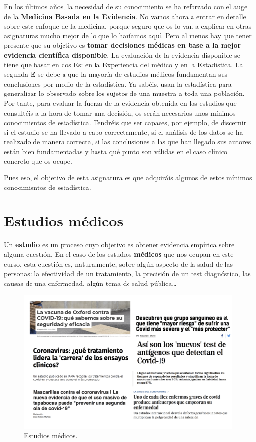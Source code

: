 \documentclass[
]{book}
\theoremstyle{definition}
\theoremstyle{definition}
\theoremstyle{definition}
\theoremstyle{definition}
\theoremstyle{remark}
\begin{document}
En los últimos años, la necesidad de su conocimiento se ha reforzado con el auge de la \textbf{Medicina Basada en la Evidencia}. No vamos ahora a entrar en detalle sobre este enfoque de la medicina, porque seguro que os lo van a explicar en otras asignaturas mucho mejor de lo que lo haríamos aquí. Pero al menos hay que tener presente que su objetivo es \textbf{tomar decisiones médicas en base a la mejor evidencia científica disponible}. La evaluación de la evidencia disponible se tiene que basar en dos Es: en la \textbf{E}xperiencia del médico y en la \textbf{E}stadística. La segunda \textbf{E} se debe a que la mayoría de estudios médicos fundamentan sus conclusiones por medio de la estadística. Ya sabéis, usan la estadística para generalizar lo observado sobre los sujetos de una muestra a toda una población. Por tanto, para evaluar la fuerza de la evidencia obtenida en los estudios que consultéis a la hora de tomar una decisión, os serán necesarios unos mínimos conocimientos de estadística. Tendréis que ser capaces, por ejemplo, de discernir si el estudio se ha llevado a cabo correctamente, si el análisis de los datos se ha realizado de manera correcta, si las conclusiones a las que han llegado sus autores están bien fundamentadas y hasta qué punto son válidas en el caso clínico concreto que os ocupe.

Pues eso, el objetivo de esta asignatura es que adquiráis algunos de estos mínimos conocimientos de estadística.

\hypertarget{estudios-muxe9dicos}{%
\chapter{Estudios médicos}\label{estudios-muxe9dicos}}

Un \textbf{estudio} es un proceso cuyo objetivo es obtener evidencia empírica sobre alguna cuestión. En el caso de los estudios \textbf{médicos} que nos ocupan en este curso, esta cuestión es, naturalmente, sobre algún aspecto de la salud de las personas: la efectividad de un tratamiento, la precisión de un test diagnóstico, las causas de una enfermedad, algún tema de salud pública\ldots{}

\begin{figure}

{\centering \includegraphics[width=0.8\linewidth]{INREMDN_files/figure-html/anuncis} 

}

\caption{Estudios médicos.}\label{fig:anuncis}
\end{figure}
\end{document}
